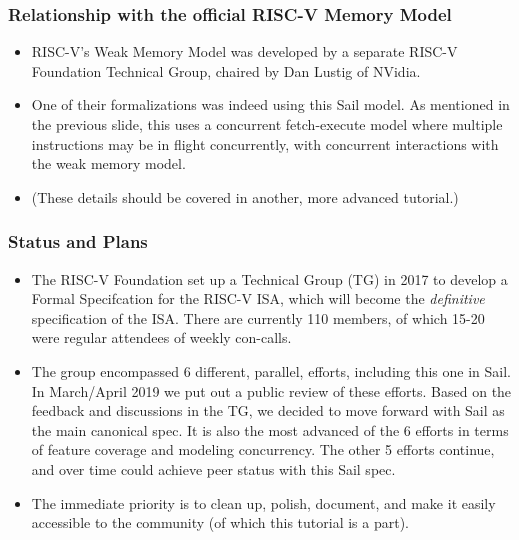 \documentclass[aspectratio=169]{beamer}
\newcommand{\slidefont}{\scriptsize}
\begin{document}
\begin{frame}[fragile]
  \frametitle{Relationship with the official RISC-V Memory Model}

  \slidefont

  \begin{itemize}
  \item
    RISC-V's Weak Memory Model was developed by a separate RISC-V
    Foundation Technical Group, chaired by Dan Lustig of NVidia.

  \item 
    One of their formalizations was indeed using this Sail model.  As
    mentioned in the previous slide, this uses a concurrent
    fetch-execute model where multiple instructions may be in flight
    concurrently, with concurrent interactions with the weak memory
    model.

  \item
    (These details should be covered in another, more advanced tutorial.)

  \end{itemize}

\end{frame}


\begin{frame}[fragile]
  \frametitle{Status and Plans}

  \slidefont

  \begin{itemize}
  \item
    The RISC-V Foundation set up a Technical Group (TG) in 2017 to
    develop a Formal Specifcation for the RISC-V ISA, which will
    become the \emph{definitive} specification of the ISA.  There are
    currently 110 members, of which 15-20 were regular attendees of
    weekly con-calls.

  \item 
    The group encompassed 6 different, parallel, efforts, including
    this one in Sail.  In March/April 2019 we put out a public review
    of these efforts.  Based on the feedback and discussions in the
    TG, we decided to move forward with Sail as the main canonical
    spec. It is also the most advanced of the 6 efforts in terms of
    feature coverage and modeling concurrency.  The other 5 efforts
    continue, and over time could achieve peer status with this Sail
    spec.

  \item
    The immediate priority is to clean up, polish, document, and make
    it easily accessible to the community (of which this tutorial is a
    part).

  \end{itemize}

\end{frame}
\end{document}
